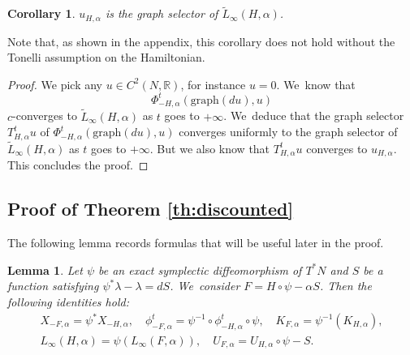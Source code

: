 \documentclass[JEP,XML,SOM,Unicode,NoFloatCountersInSection,published]{cedram}
\newtheorem{cor}[thm]{Corollary}
\newtheorem{lem}[thm]{Lemma}
\theoremstyle{definition}
\newcommand{\R}{\mathbb{R}}
\begin{document}
\begin{cor}\label{cor:KAMF-graph-selector}
$u_{H, \alpha}$ is the graph selector of $\tilde L_\infty(H, \alpha)$.
\end{cor}

Note that, as shown in the appendix, this corollary does not hold without the Tonelli assumption on the Hamiltonian.

\begin{proof}
We pick any $u\in C^2(N,\R)$, for instance $u=0$. We~know that\vspace*{-3pt}
\[
\Phi_{-H,\alpha}^t(\text{graph}(du), u)
\]
$c$-converges to $\tilde L_\infty(H, \alpha)$ as $t$ goes to $+\infty$. We~deduce that the graph selector $T^t_{H,\alpha}u$ of $\Phi_{-H,\alpha}^t(\text{graph}(du), u)$ converges uniformly to the graph selector of $\tilde L_\infty(H, \alpha)$ as $t$ goes to $+\infty$. But we also know that $T^t_{H,\alpha}u$ converges to $u_{H, \alpha}$. This concludes the proof.
\end{proof}

\subsection{Proof of Theorem \ref{th:discounted}}\label{sec:proof-discounted}

The following lemma records formulas that will be useful later in the proof.

\begin{lem}\label{lem:conjugacy-Hamiltonian-exact-symplectic}
Let $\psi$ be an exact symplectic diffeomorphism of $T^*N$ and $S$ be a function satisfying $\psi^*\lambda-\lambda=dS$. We~consider $F=H\circ \psi -\alpha S$. Then the following identities hold:\vspace*{-3pt}
\begin{gather*}
X_{-F,\alpha}=\psi^*X_{-H,\alpha}, \quad \phi^t_{-F,\alpha}=\psi^{-1}\circ \phi_{-H, \alpha}^t\circ \psi,\quad K_{F,\alpha}=\psi^{-1}(K_{H,\alpha}),\\
L_\infty(H, \alpha)=\psi(L_\infty(F, \alpha)),\quad U_{F, \alpha}=U_{H,\alpha}\circ \psi-S.
\end{gather*}
\end{lem}
\end{document}
